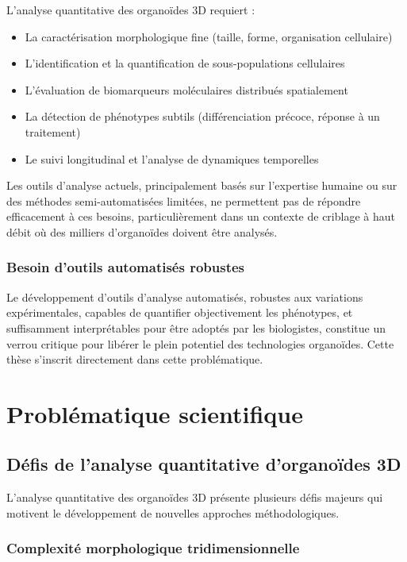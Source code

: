 L'analyse quantitative des organoïdes 3D requiert :
\begin{itemize}
    \item La caractérisation morphologique fine (taille, forme, organisation cellulaire)
    \item L'identification et la quantification de sous-populations cellulaires
    \item L'évaluation de biomarqueurs moléculaires distribués spatialement
    \item La détection de phénotypes subtils (différenciation précoce, réponse à un traitement)
    \item Le suivi longitudinal et l'analyse de dynamiques temporelles
\end{itemize}

Les outils d'analyse actuels, principalement basés sur l'expertise humaine ou sur des méthodes semi-automatisées limitées, ne permettent pas de répondre efficacement à ces besoins, particulièrement dans un contexte de criblage à haut débit où des milliers d'organoïdes doivent être analysés.

\subsubsection{Besoin d'outils automatisés robustes}

Le développement d'outils d'analyse automatisés, robustes aux variations expérimentales, capables de quantifier objectivement les phénotypes, et suffisamment interprétables pour être adoptés par les biologistes, constitue un verrou critique pour libérer le plein potentiel des technologies organoïdes. Cette thèse s'inscrit directement dans cette problématique.

\section{Problématique scientifique}

\subsection{Défis de l'analyse quantitative d'organoïdes 3D}

L'analyse quantitative des organoïdes 3D présente plusieurs défis majeurs qui motivent le développement de nouvelles approches méthodologiques.

\subsubsection{Complexité morphologique tridimensionnelle}

